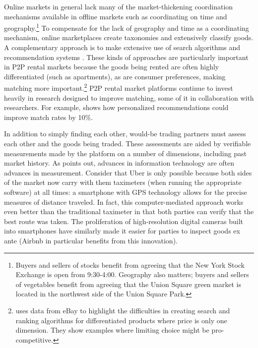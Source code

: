\documentclass[11pt]{article}
\begin{document}
Online markets in general lack many of the market-thickening coordination mechanisms available in offline markets such as coordinating on time and geography.\footnote{
  Buyers and sellers of stocks benefit from agreeing that the New York Stock Exchange is open from 9:30-4:00.
  Geography also matters; buyers and sellers of vegetables benefit from agreeing that the Union Square green market is located in the northwest side of the Union Square Park.
}
To compensate for the lack of geography and time as a coordinating mechanism, online marketplaces create taxonomies and extensively classify goods.
A complementary approach is to make extensive use of search algorithms and recommendation systems \citep{resnick1997recommender, adomavicius2005toward}.
These kinds of approaches are particularly important in P2P rental markets because the goods being rented are often highly differentiated (such as apartments), as are consumer preferences, making matching more important.\footnote{
  \cite{dinerstein2014consumer} uses data from eBay to highlight the difficulties in creating search and ranking algorithms for differentiated products where price is only one dimension.
  They show examples where limiting choice might be pro-competitive.
}
P2P rental market platforms continue to invest heavily in research designed to improve matching, some of it in collaboration with researchers. 
For example, \cite{fradkin2013search} shows how personalized recommendations could improve match rates by 10\%. 

In addition to simply finding each other, would-be trading partners must assess each other and the goods being traded. 
These assessments are aided by verifiable measurements made by the platform on a number of dimensions, including past market history. 
As \cite{varian2010computer} points out, advances in information technology are often advances in measurement.  
Consider that Uber is only possible because both sides of the market now carry with them taximeters (when running the appropriate software) at all times: 
a smartphone with GPS technology allows for the precise measures of distance traveled.
In fact, this computer-mediated approach works even better than the traditional taximeter in that both parties can verify that the best route was taken. 
The proliferation of high-resolution digital cameras built into smartphones have similarly made it easier for parties to inspect goods ex ante (Airbnb in particular benefits from this innovation).  
\end{document}
